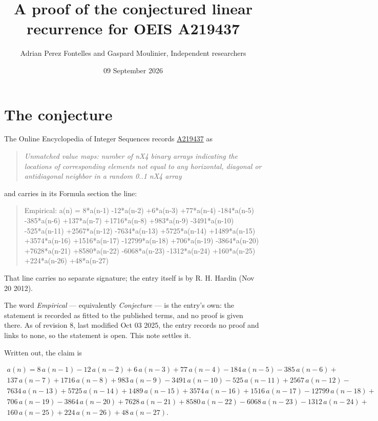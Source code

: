 \documentclass[11pt]{article}
\title{A proof of the conjectured linear recurrence for OEIS A219437}
\author{Adrian Perez Fontelles and Gaspard Moulinier, Independent researchers}
\date{09 September 2026}
\theoremstyle{definition}
\begin{document}
\maketitle
\section{The conjecture}

The Online Encyclopedia of Integer Sequences records \href{https://oeis.org/A219437}{A219437} as

\begin{quote}\itshape Unmatched value maps: number of nX4 binary arrays indicating the locations of corresponding elements not equal to any horizontal, diagonal or antidiagonal neighbor in a random 0..1 nX4 array\end{quote}

and carries in its Formula section the line:

\begin{quote}\ttfamily Empirical: a(n) = 8*a(n-1) -12*a(n-2) +6*a(n-3) +77*a(n-4) -184*a(n-5) -385*a(n-6) +137*a(n-7) +1716*a(n-8) +983*a(n-9) -3491*a(n-10) -525*a(n-11) +2567*a(n-12) -7634*a(n-13) +5725*a(n-14) +1489*a(n-15) +3574*a(n-16) +1516*a(n-17) -12799*a(n-18) +706*a(n-19) -3864*a(n-20) +7628*a(n-21) +8580*a(n-22) -6068*a(n-23) -1312*a(n-24) +160*a(n-25) +224*a(n-26) +48*a(n-27)\end{quote}

That line carries no separate signature; the entry itself is by R. H. Hardin (Nov 20 2012).

The word {\itshape Empirical} --- equivalently {\itshape Conjecture} --- is the entry's own: the statement is recorded as fitted to the published terms, and no proof is given there. As of revision 8, last modified Oct 03 2025, the entry records no proof and links to none, so the statement is open. This note settles it.

Written out, the claim is

\begin{multline*} a(n) = 8\,a(n-1) - 12\,a(n-2) + 6\,a(n-3) + 77\,a(n-4) - 184\,a(n-5) - 385\,a(n-6) + \\ 137\,a(n-7) + 1716\,a(n-8) + 983\,a(n-9) - 3491\,a(n-10) - 525\,a(n-11) + 2567\,a(n-12) - \\ 7634\,a(n-13) + 5725\,a(n-14) + 1489\,a(n-15) + 3574\,a(n-16) + 1516\,a(n-17) - 12799\,a(n-18) + \\ 706\,a(n-19) - 3864\,a(n-20) + 7628\,a(n-21) + 8580\,a(n-22) - 6068\,a(n-23) - 1312\,a(n-24) + \\ 160\,a(n-25) + 224\,a(n-26) + 48\,a(n-27). \end{multline*}
\end{document}
